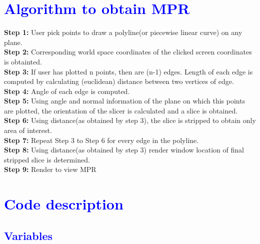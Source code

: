 \documentclass[12pt]{report}
\begin{document}
\section{\textcolor{blue}{Algorithm to obtain MPR} }
\textbf{Step 1:} User pick points to draw a polyline(or piecewise linear curve) on any plane. \\
\textbf{Step 2:} Corresponding world space coordinates of the clicked screen coordinates is obtainted. \\
\textbf{Step 3:} If user has plotted n points, then are (n-1) edges. Length of each edge is computed by calculating (euclidean) distance between two vertices of edge.  \\
\textbf{Step 4:} Angle of each edge is computed.   \\
\textbf{Step 5:} Using angle and normal information of the plane on which this points are plotted, the orientation of the slicer is calculated and a slice is obtained. \\
\textbf{Step 6:} Using distance(as obtained by step 3), the slice is stripped to obtain only area of interest. \\
\textbf{Step 7:} Repeat Step 3 to Step 6 for every edge in the polyline. \\
\textbf{Step 8:} Using distance(as obtained by step 3) render window location of final stripped slice is determined.\\
\textbf{Step 9:} Render to view MPR


\section{\textcolor{blue}{Code description} }
\subsection{\textcolor{blue}{Variables} }
\end{document}
